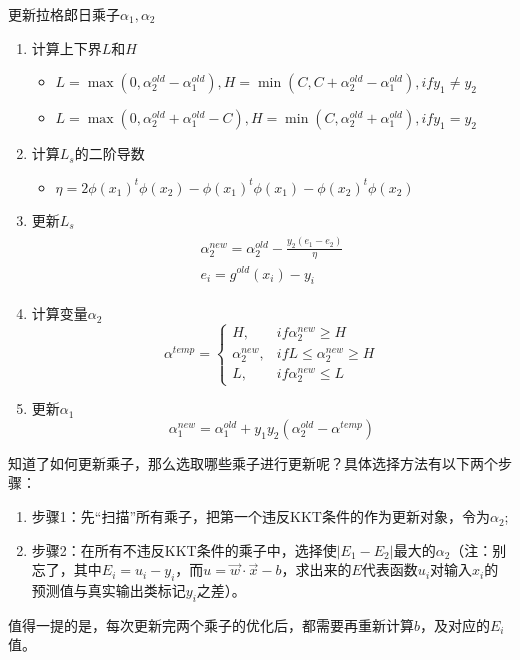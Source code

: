 \documentclass[a4paper,12pt]{article}
\begin{document}
更新拉格郎日乘子$\alpha_1,\alpha_2$
\begin{enumerate}[-步骤1:~]
    \item 计算上下界$L$和$H$
      \begin{itemize}
          \item $L=\max(0,\alpha_2^{old}-\alpha_1^{old}),H=\min(C,C+\alpha_2^{old}-\alpha_1^{old}),if y_1\neq y_2$
          \item $L=\max(0,\alpha_2^{old}+\alpha_1^{old}-C),H=\min(C,\alpha_2^{old}+\alpha_1^{old}),if y_1= y_2$
      \end{itemize}
    \item 计算$L_s$的二阶导数
      \begin{itemize}
        \item $\eta=2\phi(x_1)^t\phi(x_2)-\phi(x_1)^t\phi(x_1)-\phi(x_2)^t\phi(x_2)$
      \end{itemize}
    \item 更新$L_s$
          \begin{equation*}
            \begin{split}
              \begin{array}{c}
                \alpha_2^{new}=\alpha_2^{old}-\frac{y_2(e_1-e_2)}{\eta}\\
                e_i=g^{old}(x_i)-y_i
              \end{array}
            \end{split}
          \end{equation*}
    \item 计算变量$\alpha_2$
      \begin{equation*}
        \alpha^{temp}=\left\{\begin{array}{rl}
            H, & if \alpha_2^{new}\geq H\\
            \alpha_2^{new}, & if L\leq\alpha_2^{new}\geq H\\
            L, & if \alpha_2^{new}\leq L
        \end{array}\right.
      \end{equation*}
    \item 更新$\alpha_1$
      $$\alpha_1^{new}=\alpha_1^{old}+y_1y_2(\alpha_2^{old}-\alpha^{temp})$$
\end{enumerate}
 知道了如何更新乘子，那么选取哪些乘子进行更新呢？具体选择方法有以下两个步骤：
 \begin{enumerate}[1.~]
     \item 步骤1：先“扫描”所有乘子，把第一个违反KKT条件的作为更新对象，令为$\alpha_2$;
     \item 步骤2：在所有不违反KKT条件的乘子中，选择使$|E_1 −E_2|$最大的$\alpha_2$（注：别忘了，其中$E_i=u_i-y_i$，而$u=\vec w\cdot \vec x-b$，求出来的$E$代表函数$u_i$对输入$x_i$的预测值与真实输出类标记$y_i$之差）。
\end{enumerate}
 值得一提的是，每次更新完两个乘子的优化后，都需要再重新计算$b$，及对应的$E_i$值。
\end{document}
